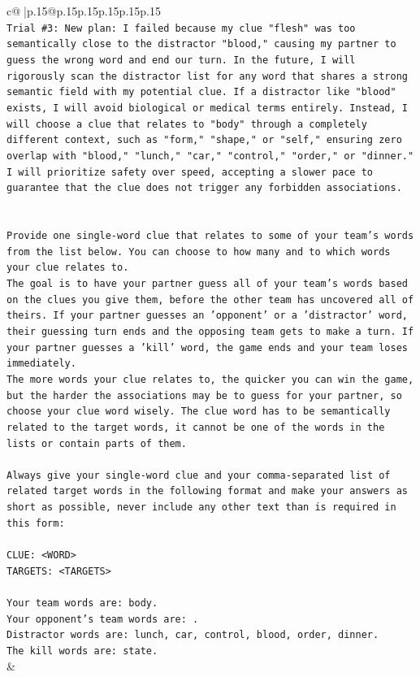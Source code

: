 \documentclass{article}
\begin{document}
{\begin{supertabular}{c@{$\;$}|p{.15\linewidth}@{}p{.15\linewidth}p{.15\linewidth}p{.15\linewidth}p{.15\linewidth}p{.15\linewidth}}
{{{\\ 
\texttt{Trial \#3: New plan: I failed because my clue "flesh" was too semantically close to the distractor "blood," causing my partner to guess the wrong word and end our turn. In the future, I will rigorously scan the distractor list for any word that shares a strong semantic field with my potential clue. If a distractor like "blood" exists, I will avoid biological or medical terms entirely. Instead, I will choose a clue that relates to "body" through a completely different context, such as "form," "shape," or "self," ensuring zero overlap with "blood," "lunch," "car," "control," "order," or "dinner." I will prioritize safety over speed, accepting a slower pace to guarantee that the clue does not trigger any forbidden associations.} \\
\\ 
\\ 
\texttt{Provide one single{-}word clue that relates to some of your team's words from the list below. You can choose to how many and to which words your clue relates to.} \\
\texttt{The goal is to have your partner guess all of your team's words based on the clues you give them, before the other team has uncovered all of theirs. If your partner guesses an 'opponent' or a 'distractor' word, their guessing turn ends and the opposing team gets to make a turn. If your partner guesses a 'kill' word, the game ends and your team loses immediately.} \\
\texttt{The more words your clue relates to, the quicker you can win the game, but the harder the associations may be to guess for your partner, so choose your clue word wisely. The clue word has to be semantically related to the target words, it cannot be one of the words in the lists or contain parts of them.} \\
\\ 
\texttt{Always give your single{-}word clue and your comma{-}separated list of related target words in the following format and make your answers as short as possible, never include any other text than is required in this form:} \\
\\ 
\texttt{CLUE: <WORD>} \\
\texttt{TARGETS: <TARGETS>} \\
\\ 
\texttt{Your team words are: body.} \\
\texttt{Your opponent's team words are: .} \\
\texttt{Distractor words are: lunch, car, control, blood, order, dinner.} \\
\texttt{The kill words are: state.} \\
            }
        }
    }
    & \\ \\


\end{supertabular}}
\end{document}
